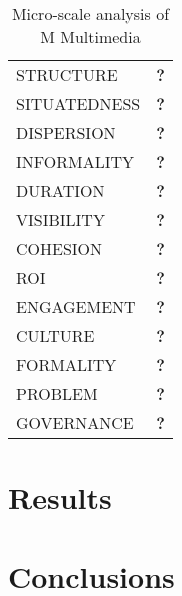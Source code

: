 \documentclass[
a4paper,
11pt,
parskip,
\MYLANGUAGE,
abstractoff,
bibliography=totoc
]{scrartcl}
\begin{document}
\begin{table}[htbp]
\begin{center}
\begin{tabular}{lp{100mm}}
STRUCTURE & {\bf ?} \\
SITUATEDNESS & {\bf ?} \\
DISPERSION & {\bf ?} \\
INFORMALITY & {\bf ?} \\
DURATION & {\bf ?} \\
VISIBILITY & {\bf ?} \\
COHESION & {\bf ?} \\
ROI & {\bf ?} \\
ENGAGEMENT & {\bf ?} \\
CULTURE & {\bf ?} \\
FORMALITY & {\bf ?} \\
PROBLEM & {\bf ?} \\
GOVERNANCE & {\bf ?} \\
\end{tabular}
\vspace{1em}
\caption{Micro-scale analysis of M Multimedia}
\label{tab:microconn}
\end{center}
\end{table}



\section{Results}


\section{Conclusions}





\end{document}
